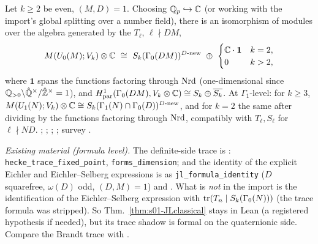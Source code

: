 \begin{theorem}\label{thm:s01-JLclassical}
Let $k\ge2$ be even, $(M,D)=1$. Choosing $\mathbb{Q}_p\hookrightarrow\mathbb{C}$ (or working with the import's global splitting over a number
field), there is an isomorphism of modules over the algebra generated by the $T_\ell$, $\ell\nmid DM$,
\[\Brandt{\Uzero{M}}{V_k}\otimes\C\ \cong\ S_k(\Gamma_0(DM))^{D\text{-new}}\ \oplus\ \begin{cases}\C\cdot\mathbf 1&k=2,\\0&k>2,\end{cases}\]
where $\mathbf 1$ spans the functions factoring through $\mathrm{Nrd}$ (one-dimensional since $\mathbb{Q}_{>0}\backslash\hat{\mathbb{Q}}^\times/\hat{\mathbb{Z}}^\times=1$),
and $H^1_{\rm par}(\Gamma_0(DM),V_k\otimes\mathbb{C})\cong S_k\oplus\overline{S_k}$. At $\Gamma_1$-level: for $k\ge3$,
$M(U_1(N);V_k)\otimes\mathbb{C}\cong S_k(\Gamma_1(N)\cap\Gamma_0(D))^{D\text{-new}}$, and for $k=2$ the same after dividing
by the functions factoring through $\mathrm{Nrd}$, compatibly with $T_\ell,S_\ell$ for $\ell\nmid ND$.
\stcited{} ; ; ; ;
survey .
\end{theorem}
\noindent\emph{Existing material (formula level).} The definite-side trace is \stformal:
 \texttt{hecke\_trace\_fixed\_point},  \texttt{forms\_dimension}; and the
identity of the explicit Eichler and Eichler--Selberg expressions is \stformal{} as 
\texttt{jl\_formula\_identity} ($D$ squarefree, $\omega(D)$ odd, $(D,M)=1$) and . What is
\emph{not} in the import is the identification of the Eichler--Selberg expression with $\operatorname{tr}(T_n\mid S_k(\Gamma_0(N)))$ (the
trace formula was stripped). So Thm.~\ref{thm:s01-JLclassical} stays \stcited{} in Lean (a registered hypothesis if needed),
but its trace shadow is formal on the quaternionic side. Compare the Brandt trace with
.

